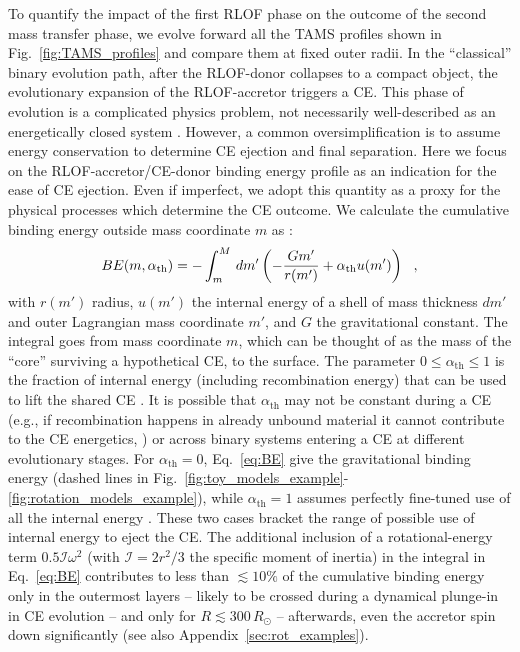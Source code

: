 \documentclass[twocolumn,twocolappendix,trackchanges]{aastex63}
\DeclareRobustCommand{\Eqref}[1]{Eq.~\ref{#1}}
\DeclareRobustCommand{\Figref}[1]{Fig.~\ref{#1}}
\begin{document}
To quantify the impact of the first RLOF phase on the outcome of the
second mass transfer phase, we evolve forward all the TAMS profiles
shown in \Figref{fig:TAMS_profiles} and compare them at fixed outer
radii. In the ``classical'' binary evolution path, after the
RLOF-donor collapses to a compact object, the evolutionary expansion
of the RLOF-accretor triggers a CE. This phase of evolution is a
complicated physics problem, not necessarily well-described as an
energetically closed system \citep[e.g.,][]{ivanova:2013,
  ivanova:2020, renzo:21gwce}.  However, a common oversimplification
is to assume energy conservation
\citep[``$\alpha_{\mathrm{CE}}\lambda_\mathrm{CE}$ algorithm'',
e.g.,][]{webbink:1984, dekool:1990, demarco:11} to determine CE
ejection and final separation. Here we focus on the
RLOF-accretor/CE-donor binding energy profile as an indication for the
ease of CE ejection. Even if imperfect, we adopt this quantity as a
proxy for the physical processes which determine the CE outcome. We
calculate the cumulative binding energy outside mass coordinate $m$ as
\citep[e.g.,][]{dekool:1990, dewi:2000, lau:2022}:
\begin{equation}
  \label{eq:BE}
BE(m, \alpha_{\rm th}) = - \int_{m}^M\,dm'\left( -\frac{G m'}{r(m')}+\alpha_\mathrm{th} u(m')\right) \ \ ,
\end{equation}
with $r(m')$ radius, $u(m')$ the internal energy of a shell of mass
thickness $dm'$ and outer Lagrangian mass coordinate $m'$, and $G$ the
gravitational constant. The integral goes from mass coordinate $m$,
which can be thought of as the mass of the ``core'' surviving a
hypothetical CE, to the surface. The parameter
$0\leq \alpha_\mathrm{th}\leq 1$ is the fraction of internal energy
(including recombination energy) that can be used to lift the shared
CE \citep[e.g.,][]{han:95}. It is possible that $\alpha_\mathrm{th}$
may not be constant during a CE (e.g., if recombination happens in
already unbound material it cannot contribute to the CE energetics,
\citealt{lau:22}) or across binary systems entering a CE at different
evolutionary stages. For $\alpha_\mathrm{th}=0$, \Eqref{eq:BE} give
the gravitational binding energy (dashed lines in
\Figref{fig:toy_models_example}-\ref{fig:rotation_models_example}),
while $\alpha_{\mathrm{th}}=1$ assumes perfectly fine-tuned use of all
the internal energy \citep[solid lines,][]{klencki:2020}. These two
cases bracket the range of possible use of internal energy to eject
the CE. The additional inclusion of a rotational-energy term
$0.5 \mathcal{I} \omega^2$ (with $\mathcal{I}=2r^2/3$ the specific
moment of inertia) in the integral in \Eqref{eq:BE} contributes to
less than $\lesssim 10\%$ of the cumulative binding energy only in the
outermost layers -- likely to be crossed during a dynamical plunge-in
in CE evolution -- and only for $R\lesssim 300\,R_\odot$ --
afterwards, even the accretor spin down significantly (see also
Appendix~\ref{sec:rot_examples}).
\end{document}
